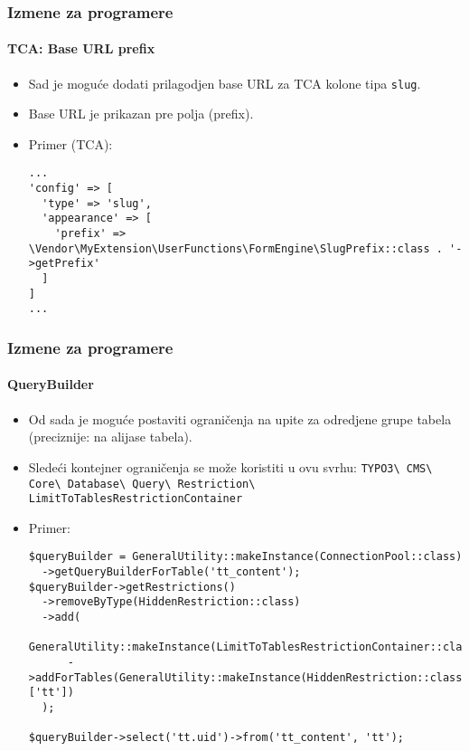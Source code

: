 \begin{frame}[fragile]
	\frametitle{Izmene za programere}
	\framesubtitle{TCA: Base URL prefix}

	\lstset{basicstyle=\tiny\ttfamily}

	\begin{itemize}

		\item Sad je moguće dodati prilagodjen base URL za TCA kolone tipa \texttt{slug}.
		\item Base URL je prikazan pre polja (prefix).
		\item Primer (TCA):

\vspace{-0.4cm}
\begin{lstlisting}
...
'config' => [
  'type' => 'slug',
  'appearance' => [
    'prefix' => \Vendor\MyExtension\UserFunctions\FormEngine\SlugPrefix::class . '->getPrefix'
  ]
]
...
\end{lstlisting}

	\end{itemize}

\end{frame}


\begin{frame}[fragile]
	\frametitle{Izmene za programere}
	\framesubtitle{QueryBuilder}

	\lstset{basicstyle=\tiny\ttfamily}

	\begin{itemize}
		\item Od sada je moguće postaviti ograničenja na upite za odredjene grupe tabela
			(preciznije: na alijase tabela).
		\item Sledeći kontejner ograničenja se može koristiti u ovu svrhu:\newline
			\begingroup
				\fontsize{7}{9}
					\texttt{TYPO3\textbackslash
						CMS\textbackslash
						Core\textbackslash
						Database\textbackslash
						Query\textbackslash
						Restriction\textbackslash
						LimitToTablesRestrictionContainer}
			\endgroup

		\item Primer:
\begin{lstlisting}
$queryBuilder = GeneralUtility::makeInstance(ConnectionPool::class)
  ->getQueryBuilderForTable('tt_content');
$queryBuilder->getRestrictions()
  ->removeByType(HiddenRestriction::class)
  ->add(
    GeneralUtility::makeInstance(LimitToTablesRestrictionContainer::class)
      ->addForTables(GeneralUtility::makeInstance(HiddenRestriction::class), ['tt'])
  );

$queryBuilder->select('tt.uid')->from('tt_content', 'tt');
\end{lstlisting}

	\end{itemize}

\end{frame}

